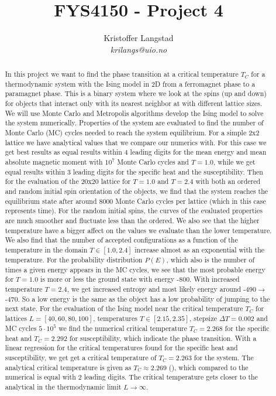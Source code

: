 \documentclass[12pt,a4paper,english]{article}
\title{FYS4150 - Project 4}
\date{}
\author{ Kristoffer Langstad\\ \textit{krilangs@uio.no}}
\begin{document}
\maketitle
\begin{abstract}
In this project we want to find the phase transition at a critical temperature $T_C$ for a thermodynamic system with the Ising model in 2D from a ferromagnet phase to a paramagnet phase. This is a binary system where we look at the spins (up and down) for objects that interact only with its nearest neighbor at with different lattice sizes. We will use Monte Carlo and Metropolis algorithms develop the Ising model to solve the system numerically. Properties of the system are evaluated to find the number of Monte Carlo (MC) cycles needed to reach the system equilibrium. For a simple 2x2 lattice we have analytical values that we compare our numerics with. For this case we get best results as equal results within 4 leading digits for the mean energy and mean absolute magnetic moment with $10^7$ Monte Carlo cycles and $T=1.0$, while we get equal results within 3 leading digits for the specific heat and the susceptibility. Then for the evaluation of the 20x20 lattice for $T=1.0$ and $T=2.4$ with both an ordered and random initial spin orientation of the objects, we find that the system reaches the equilibrium state after around 8000 Monte Carlo cycles per lattice (which in this case represents time). For the random initial spins, the curves of the evaluated properties are much smoother and fluctuate less than the ordered. We also see that the higher temperature have a bigger affect on the values we evaluate than the lower temperature. We also find that the number of accepted configurations as a function of the temperature in the domain $T\in[1.0, 2.4]$ increase almost as an exponential with the temperature. For the probability distribution $P(E)$, which also is the number of times a given energy appears in the MC cycles, we see that the most probable energy for $T=1.0$ is more or less the ground state with energy -800. With increased temperature $T=2.4$, we get increased entropy and most likely energy around -490$\rightarrow$ -470. So a low energy is the same as the object has a low probability of jumping to the next state. For the evaluation of the Ising model near the critical temperature $T_C$ for lattices $L=[40,60,80,100]$, temperatures $T\in[2.15, 2.35]$, stepsize $\Delta T=0.002$ and MC cycles $5\cdot10^5$ we find the numerical critical temperature $T_C=2.268$ for the specific heat and $T_C=2.292$ for susceptibility, which indicate the phase transition. With a linear regression for the critical temperatures found for the specific heat and susceptibility, we get get a critical temperature of $T_C=2.263$ for the system. The analytical critical temperature is given as $T_C\approx2.269$ (\citet{PhysRev.65.117}), which compared to the numerical is equal with 2 leading digits. The critical temperature gets closer to the analytical in the thermodynamic limit $L\rightarrow\infty$.
\end{abstract}
\end{document}
